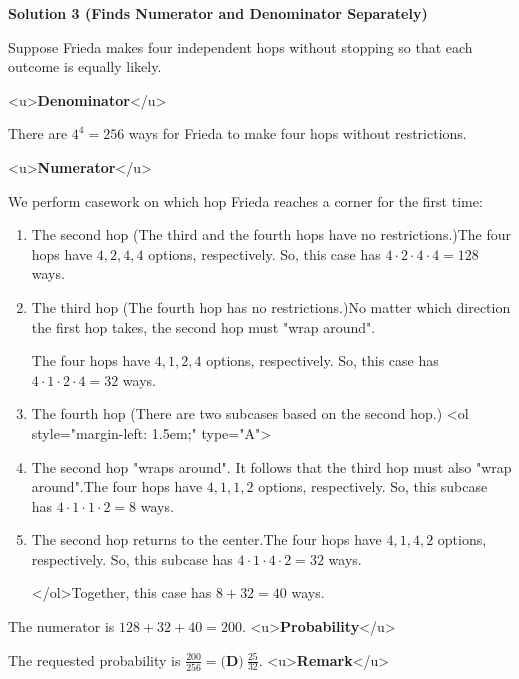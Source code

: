 \begin{enumerate}
 



\textbf{Solution 3 (Finds Numerator and Denominator Separately)}

Suppose Frieda makes four independent hops without stopping so that each outcome is equally likely.

 <u>\textbf{Denominator}</u>

 There are $4^4=256$ ways for Frieda to make four hops without restrictions.

 <u>\textbf{Numerator}</u>

 We perform casework on which hop Frieda reaches a corner for the first time:

 
            \begin{enumerate} 
        \item The second hop (The third and the fourth hops have no restrictions.)The four hops have $4, 2, 4, 4$ options, respectively. So, this case has $4\cdot2\cdot4\cdot4=128$ ways. 

  

 
        \item The third hop (The fourth hop has no restrictions.)No matter which direction the first hop takes, the second hop must "wrap around". 

 The four hops have $4, 1, 2, 4$ options, respectively. So, this case has $4\cdot1\cdot2\cdot4=32$ ways. 

  

 
        \item The fourth hop (There are two subcases based on the second hop.)
<ol style="margin-left: 1.5em;" type="A"> 
        \item The second hop "wraps around". It follows that the third hop must also "wrap around".The four hops have $4, 1, 1, 2$ options, respectively. So, this subcase has $4\cdot1\cdot1\cdot2=8$ ways. 

  

 
        \item The second hop returns to the center.The four hops have $4, 1, 4, 2$ options, respectively. So, this subcase has $4\cdot1\cdot4\cdot2=32$ ways.     

 </ol>Together, this case has $8+32=40$ ways.

 
            \end{enumerate}
            The numerator is $128+32+40=200.$
<u>\textbf{Probability}</u>

 The requested probability is $\frac{200}{256}=\boxed{\textbf{(D)} ~\frac{25}{32}}.$
<u>\textbf{Remark}</u>


\end{enumerate}
